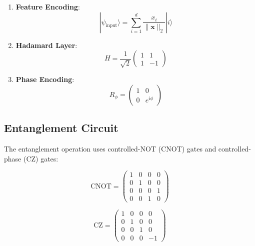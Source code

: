 \documentclass[10pt]{article}
\begin{document}
\begin{enumerate}
    \item \textbf{Feature Encoding}:
    \begin{equation}
        |\psi_{\text{input}}\rangle = \sum_{i=1}^d \frac{x_i}{\|\mathbf{x}\|_2} |i\rangle
    \end{equation}

    \item \textbf{Hadamard Layer}:
    \begin{equation}
        H = \frac{1}{\sqrt{2}}\begin{pmatrix} 1 & 1 \\ 1 & -1 \end{pmatrix}
    \end{equation}

    \item \textbf{Phase Encoding}:
    \begin{equation}
        R_{\phi} = \begin{pmatrix} 1 & 0 \\ 0 & e^{i\phi} \end{pmatrix}
    \end{equation}
\end{enumerate}

\subsection{Entanglement Circuit}
The entanglement operation uses controlled-NOT (CNOT) gates and controlled-phase (CZ) gates:

\begin{equation}
    \text{CNOT} = \begin{pmatrix} 
    1 & 0 & 0 & 0 \\
    0 & 1 & 0 & 0 \\
    0 & 0 & 0 & 1 \\
    0 & 0 & 1 & 0
    \end{pmatrix}
\end{equation}

\begin{equation}
    \text{CZ} = \begin{pmatrix}
    1 & 0 & 0 & 0 \\
    0 & 1 & 0 & 0 \\
    0 & 0 & 1 & 0 \\
    0 & 0 & 0 & -1
    \end{pmatrix}
\end{equation}
\end{document}
